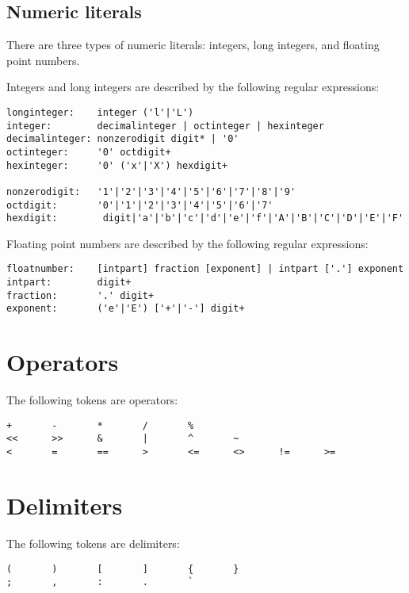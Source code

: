 \subsection{Numeric literals}

There are three types of numeric literals: integers, long integers,
and floating point numbers.

Integers and long integers are described by the following regular expressions:

\begin{verbatim}
longinteger:    integer ('l'|'L')
integer:        decimalinteger | octinteger | hexinteger
decimalinteger: nonzerodigit digit* | '0'
octinteger:     '0' octdigit+
hexinteger:     '0' ('x'|'X') hexdigit+

nonzerodigit:   '1'|'2'|'3'|'4'|'5'|'6'|'7'|'8'|'9'
octdigit:       '0'|'1'|'2'|'3'|'4'|'5'|'6'|'7'
hexdigit:        digit|'a'|'b'|'c'|'d'|'e'|'f'|'A'|'B'|'C'|'D'|'E'|'F'
\end{verbatim}

Floating point numbers are described by the following regular expressions:

\begin{verbatim}
floatnumber:    [intpart] fraction [exponent] | intpart ['.'] exponent
intpart:        digit+
fraction:       '.' digit+
exponent:       ('e'|'E') ['+'|'-'] digit+
\end{verbatim}

\section{Operators}

The following tokens are operators:

\begin{verbatim}
+       -       *       /       %
<<      >>      &       |       ^       ~
<       =       ==      >       <=      <>      !=      >=
\end{verbatim}

\section{Delimiters}

The following tokens are delimiters:

\begin{verbatim}
(       )       [       ]       {       }
;       ,       :       .       `
\end{verbatim}


